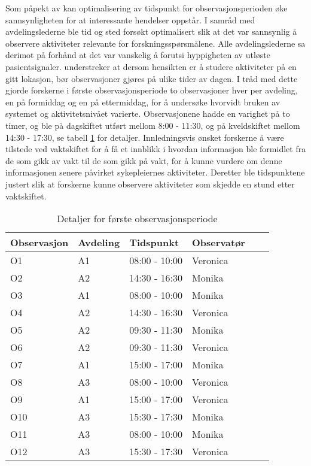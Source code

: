 \noindent
Som påpekt av \citet{Millen00} kan optimalisering av tidspunkt for observasjonsperioden øke sannsynligheten for at interessante hendelser oppstår. I samråd med avdelingslederne ble tid og sted forsøkt optimalisert slik at det var sannsynlig å observere aktiviteter relevante for forskningsspørsmålene. Alle avdelingslederne sa derimot på forhånd at det var vanskelig å forutsi hyppigheten av utløste pasientsignaler. \citet{Blomberg93} understreker at dersom hensikten er å studere aktiviteter på en gitt lokasjon, bør observasjoner gjøres på ulike tider av dagen. I tråd med dette gjorde forskerne i første observasjonsperiode to observasjoner hver per avdeling, en på formiddag og en på ettermiddag, for å undersøke hvorvidt bruken av systemet og aktivitetsnivået varierte. Observasjonene hadde en varighet på to timer, og ble på dagskiftet utført mellom 8:00 - 11:30, og på kveldskiftet mellom 14:30 - 17:30, se tabell \ref{detaljer1} for detaljer.
Innledningsvis ønsket forskerne å være tilstede ved vaktskiftet for å få et innblikk i hvordan informasjon ble formidlet fra de som gikk av vakt til de som gikk på vakt, for å kunne vurdere om denne informasjonen senere påvirket sykepleiernes aktiviteter. Deretter ble tidspunktene justert slik at forskerne kunne observere aktiviteter som skjedde en stund etter vaktskiftet.
 
\begin{table}[H]\centering
    \begin{tabular}{ |l|l|l|l|l|l| }
    \hline
    Observasjon & Avdeling & Tidspunkt & Observatør \\ \hline
       O1 & A1 & 08:00 - 10:00 & Veronica \\ \hline
       O2 & A2 & 14:30 - 16:30 & Monika \\ \hline
      O3 & A1 & 08:00 - 10:00 & Monika \\ \hline
       O4 & A2 & 14:30 - 16:30 & Veronica \\ \hline
         O5 & A2 & 09:30 - 11:30 & Monika \\ \hline
       O6 & A2 & 09:30 - 11:30 & Veronica \\ \hline
      O7 & A1 & 15:00 - 17:00 & Monika \\ \hline
       O8 & A3 & 08:00 - 10:00 & Veronica \\ \hline
       O9 & A1 & 15:00 - 17:00 & Veronica \\ \hline
       O10 & A3 & 15:30 - 17:30 & Monika \\ \hline
      O11 & A3 & 08:00 - 10:00 & Monika \\ \hline
       O12 & A3 & 15:30 - 17:30 & Veronica \\ \hline
    \end{tabular}
    \caption {Detaljer for første observasjonsperiode}
    \label{detaljer1}
\end{table}
 
